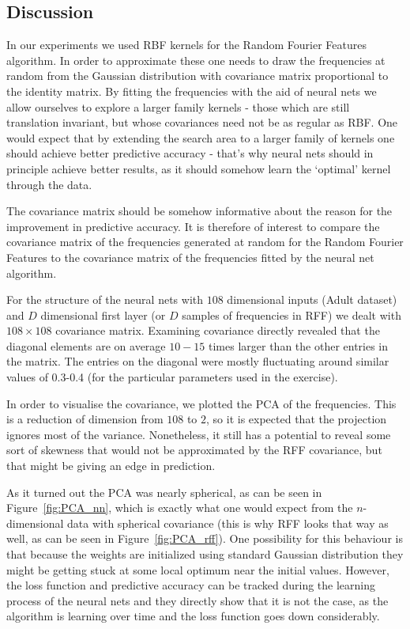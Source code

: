 \documentclass{article} %
\begin{document}
\subsection{Discussion}
In our experiments we used RBF kernels for the Random Fourier Features algorithm. In order to approximate these one needs to draw the frequencies at random from the Gaussian distribution with covariance matrix proportional to the identity matrix. By fitting the frequencies with the aid of neural nets we allow ourselves to explore a larger family kernels - those which are still translation invariant, but whose covariances need not be as regular as RBF. One would expect that by extending the search area to a larger family of kernels one should achieve better predictive accuracy - that's why neural nets should in principle achieve better results, as it should somehow learn the `optimal' kernel through the data.

The covariance matrix should be somehow informative about the reason for the improvement in predictive accuracy. It is therefore of interest to compare the covariance matrix of the frequencies generated at random for the Random Fourier Features to the covariance matrix of the frequencies fitted by the neural net algorithm.

For the structure of the neural nets with $108$ dimensional inputs (Adult dataset) and $D$ dimensional first layer (or $D$ samples of frequencies in RFF) we dealt with $108\times 108$ covariance matrix. Examining covariance directly revealed that the diagonal elements are on average $10-15$ times larger than the other entries in the matrix. The entries on the diagonal were mostly fluctuating around similar values of 0.3-0.4 (for the particular parameters used in the exercise).

In order to visualise the covariance, we plotted the PCA of the frequencies. This is a reduction of dimension from $108$ to $2$, so it is expected that the projection ignores most of the variance. Nonetheless, it still has a potential to reveal some sort of skewness that would not be approximated by the RFF covariance, but that might be giving an edge in prediction.

As it turned out the PCA was nearly spherical, as can be seen in Figure~\ref{fig:PCA_nn}, which is exactly what one would expect from the $n$-dimensional data with spherical covariance (this is why RFF looks that way as well, as can be seen in Figure~\ref{fig:PCA_rff}). One possibility for this behaviour is that because the weights are initialized using standard Gaussian distribution they might be getting stuck at some local optimum near the initial values. However, the loss function and predictive accuracy can be tracked during the learning process of the neural nets and they directly show that it is not the case, as the algorithm is learning over time and the loss function goes down considerably.
\end{document}
